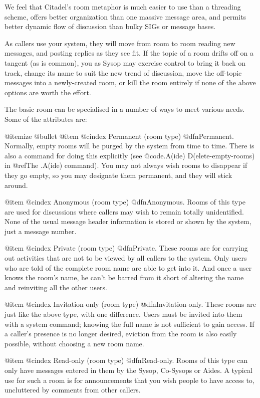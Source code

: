 We feel that Citadel's room metaphor is much easier to use
than a threading scheme, offers better organization than one massive
message area, and permits better dynamic flow of discussion than
bulky SIGs or message bases.

As callers use your system, they will move from room to room
reading new messages, and posting replies as they see fit.  If the
topic of a room drifts off on a tangent (as is common), you as
Sysop may exercise control to bring it back on track, change its
name to suit the new trend of discussion, move the off-topic messages
into a newly-created room, or kill the room entirely if none of the
above options are worth the effort.

The basic room can be specialised in a number of ways to
meet various needs.  Some of the attributes are:

@itemize @bullet
@item
@cindex Permanent (room type)
@dfn{Permanent}.  Normally, empty rooms will be purged by the
system from time to time.  There is also a command for
doing this explicitly (see @code{.A(ide) D(elete-empty-rooms)} in
@ref{The .A(ide) command}).  You may
not always wish rooms to disappear if they go empty, so
you may designate them permanent, and they will stick
around.

@item
@cindex Anonymous (room type)
@dfn{Anonymous}.  Rooms of this type are used for discussions
where callers may wish to remain totally unidentified.
None of the usual message header information is stored or
shown by the system, just a message number.

@item
@cindex Private (room type)
@dfn{Private}.  These rooms are for carrying out activities
that are not to be viewed by all callers to the system.
Only users who are told of the complete room name are
able to get into it.  And once a user knows the room's
name, he can't be barred from it short of altering the
name and reinviting all the other users.

@item
@cindex Invitation-only (room type)
@dfn{Invitation-only}.  These rooms are just like the above
type, with one difference.  Users must be invited into
them with a system command; knowing the full name is not
sufficient to gain access.  If a caller's presence is no
longer desired, eviction from the room is also easily
possible, without choosing a new room name.

@item
@cindex Read-only (room type)
@dfn{Read-only}.  Rooms of this type can only have messages
entered in them by the Sysop, Co-Sysops or Aides.  A typical use for
such a room is for announcements that you wish people to
have access to, uncluttered by comments from other callers.

